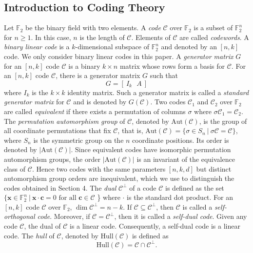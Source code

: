 \documentclass{article}
\begin{document}
\subsection{Introduction to Coding Theory}
Let $\mathbb{F}_2$ be the binary field with two elements. A \textit{code} $\mathcal{C}$ over $\mathbb{F}_2$ is a subset of $\mathbb{F}_2^n$ for $n \geq 1$. In this case, $n$ is the length of $\mathcal{C}$. Elements of $\mathcal{C}$ are called \textit{codewords}. A \textit{binary linear code} is a $k$-dimensional subspace of $\mathbb{F}_2^n$ and denoted by an $[n,k]$ code. We only consider binary linear codes in this paper. A \textit{generator matrix} $G$ for an $[n,k]$ code $\mathcal{C}$ is a binary $k \times n$ matrix whose rows form a basis for $\mathcal{C}$. For an $[n,k]$ code  $\mathcal{C}$, there is a generator matrix $G$ such that
\[
G = [~I_k~~~A~]
\]
where $I_k$ is the $k \times k$ identity matrix. Such a generator matrix is called a \textit{standard generator matrix} for $\mathcal{C}$ and is denoted by $G(\mathcal{C})$. Two codes $\mathcal{C}_1$ and $\mathcal{C}_2$ over $\mathbb{F}_2$ are called \textit{equivalent} if there exists a permutation of columns $\sigma$ where $\sigma \mathcal{C}_1 = \mathcal{C}_2$. The \textit{permutation automorphism group} of $\mathcal{C}$, denoted by $\mathrm{Aut}(\mathcal{C})$, is the group of all coordinate permutations that fix $\mathcal{C}$, that is, $\mathrm{Aut}(\mathcal{C}) = \{\sigma \in S_n ~|~ \sigma\mathcal{C} = \mathcal{C}\}$, where $S_n$ is the symmetric group on the $n$ coordinate positions. Its order is denoted by $|\mathrm{Aut}(\mathcal{C})|$. Since equivalent codes have isomorphic permutation automorphism groups, the order $|\mathrm{Aut}(\mathcal{C})|$ is an invariant of the equivalence class of $\mathcal{C}$. Hence two codes with the same parameters $[n,k,d]$ but distinct automorphism group orders are inequivalent, which we use to distinguish the codes obtained in Section 4.
The \textit{dual} $\mathcal{C}^{\perp}$ of a code $\mathcal{C}$ is defined as the set $\{\mathbf{x} \in \mathbb{F}_2^n~|~\mathbf{x} \cdot \mathbf{c} = 0  \textrm{ for all } \mathbf{c} \in \mathcal{C}$ \} where $\cdot$ is the standard dot product. For an $[n, k]$ code $\mathcal{C}$ over $\mathbb{F}_2$, $\dim \mathcal{C}^{\perp} = n-k$. If $\mathcal{C} \subseteq \mathcal{C}^{\perp}$, then $\mathcal{C}$ is called a \textit{self-orthogonal code}. Moreover, if $\mathcal{C} = \mathcal{C}^\perp$, then it is called a \textit{self-dual code}. Given any code $\mathcal{C}$, the dual of $\mathcal{C}$ is a linear code. Consequently, a self-dual code is a linear code. The \textit{hull} of $\mathcal{C}$, denoted by $\mathrm{Hull}(\mathcal{C})$ is defined as \[
\mathrm{Hull}(\mathcal{C}) = \mathcal{C} \cap \mathcal{C}^\perp.
\]
\end{document}
